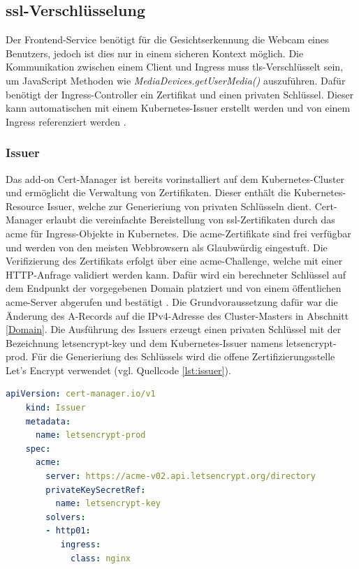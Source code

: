 \subsection{\acs{ssl}-Verschlüsselung}

Der Frontend-Service benötigt für die Gesichtserkennung die Webcam eines Benutzers, jedoch ist dies nur in einem sicheren Kontext möglich.
Die Kommunikation zwischen einem Client und Ingress muss \acs{tls}-Verschlüsselt sein, um JavaScript Methoden wie \textit{MediaDevices.getUserMedia()} auszuführen.
Dafür benötigt der Ingress-Controller ein Zertifikat und einen privaten Schlüssel.
Dieser kann automatischen mit einem Kubernetes-Issuer erstellt werden und von einem Ingress referenziert werden \cite{certmanager}.

\subsubsection{Issuer}
Das add-on Cert-Manager ist bereits vorinstalliert auf dem Kubernetes-Cluster und ermöglicht die Verwaltung von Zertifikaten.
Dieser enthält die Kubernetes-Resource Issuer, welche zur Generieriung von privaten Schlüsseln dient.
Cert-Manager erlaubt die vereinfachte Bereistellung von \ac{ssl}-Zertifikaten durch das \ac{acme} für Ingress-Objekte in Kubernetes.
Die \acs{acme}-Zertifikate sind frei verfügbar und werden von den meisten Webbrowsern als Glaubwürdig eingestuft.
Die Verifizierung des Zertifikats erfolgt über eine \acs{acme}-Challenge, welche mit einer HTTP-Anfrage validiert werden kann.
Dafür wird ein berechneter Schlüssel auf dem Endpunkt der vorgegebenen Domain platziert und von einem öffentlichen \acs{acme}-Server abgerufen und bestätigt \cite{certmanageracme}.
Die Grundvoraussetzung dafür war die Änderung des A-Records auf die IPv4-Adresse des Cluster-Masters in Abschnitt \ref{Domain}.
Die Ausführung des Issuers erzeugt einen privaten Schlüssel mit der Bezeichnung letsencrypt-key und dem Kubernetes-Issuer namens letsencrypt-prod. 
Für die Generieriung des Schlüssels wird die offene Zertifizierungsstelle Let's Encrypt verwendet \cite{letsencrypt} (vgl. Quellcode \ref{lst:issuer}). 

\begin{lstlisting}[caption={issuer.yaml \cite{certmanageracme} },captionpos=b,label={lst:issuer},language=yaml]
    apiVersion: cert-manager.io/v1
    kind: Issuer
    metadata:
      name: letsencrypt-prod
    spec:
      acme:
        server: https://acme-v02.api.letsencrypt.org/directory
        privateKeySecretRef:
          name: letsencrypt-key
        solvers:
        - http01:
           ingress:
             class: nginx

\end{lstlisting}



